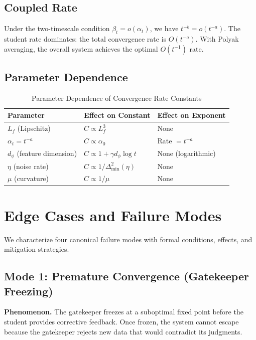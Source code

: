 \documentclass[11pt,a4paper]{article}
\theoremstyle{plain}
\theoremstyle{definition}
\theoremstyle{remark}
\begin{document}
\subsection{Coupled Rate}

Under the two-timescale condition $\beta_t = o(\alpha_t)$, we have $t^{-b} = o(t^{-a})$. The student rate dominates: the total convergence rate is $O(t^{-a})$. With Polyak averaging, the overall system achieves the optimal $O(t^{-1})$ rate.

\subsection{Parameter Dependence}

\begin{table}[ht]
\centering
\caption{Parameter Dependence of Convergence Rate Constants}
\label{tab:params}
\begin{tabular}{@{}lll@{}}
\toprule
Parameter & Effect on Constant & Effect on Exponent \\
\midrule
$L_f$ (Lipschitz) & $C \propto L_f^3$ & None \\
$\alpha_t = t^{-a}$ & $C \propto \alpha_0$ & Rate $= t^{-a}$ \\
$d_\phi$ (feature dimension) & $C \propto 1 + \gamma d_\phi \log t$ & None (logarithmic) \\
$\eta$ (noise rate) & $C \propto 1/\Delta_{\min}^2(\eta)$ & None \\
$\mu$ (curvature) & $C \propto 1/\mu$ & None \\
\bottomrule
\end{tabular}
\end{table}

\section{Edge Cases and Failure Modes}

We characterize four canonical failure modes with formal conditions, effects, and mitigation strategies.

\subsection{Mode 1: Premature Convergence (Gatekeeper Freezing)}

\textbf{Phenomenon.} The gatekeeper freezes at a suboptimal fixed point before the student provides corrective feedback. Once frozen, the system cannot escape because the gatekeeper rejects new data that would contradict its judgments.
\end{document}
